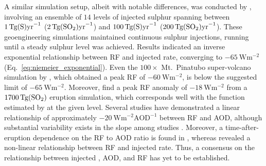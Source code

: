 \documentclass[draft]{agujournal2019}
\begin{document}
  A similar simulation setup, albeit with notable differences, was conducted by
  , involving an ensemble of \(14\) levels of injected sulphur
  spanning between \(\SI{1}{\tera\gram(\ce{S})\mathrm{yr}^{-1}}\)
  (\(\SI{2}{\tera\gram(\ce{SO2})\mathrm{yr}^{-1}}\)) and
  \(\SI{100}{\tera\gram(\ce{S})\mathrm{yr}^{-1}}\)
  (\(\SI{200}{\tera\gram(\ce{SO2})\mathrm{yr}^{-1}}\)). These geoengineering simulations
  maintained continuous sulphur injections, running until a steady sulphur level was
  achieved. Results indicated an inverse exponential relationship between RF and
  injected  rate, converging to \(\SI{-65}{\watt\metre^{-2}}\)
  (Eq.~\ref{eq:niemeier_exponential}). Even the \(100\times\) Mt.\ Pinatubo
  super-volcano simulation by , which obtained a peak RF of
  \(\SI{-60}{\watt\metre^{-2}}\), is below the suggested limit of
  \(\SI{-65}{\watt\metre^{-2}}\). Moreover,  find a peak RF anomaly
  of \(\SI{-18}{\watt\metre^{-2}}\) from a \(\SI{1700}{\tera\gram(\ce{SO2})}\) eruption
  simulation, which corresponds well with the function estimated by 
  at the given  level. Several studies have demonstrated a linear relationship
  of approximately \(-\SI{20}{\watt\metre^{-2}\mathrm{AOD}^{-1}}\) between RF and AOD,
  although substantial variability exists in the slope among studies
  \cite{mills2017,hansen2005,gregory2016,marshall2020,pitari2016b}. Moreover, a
  time-after-eruption dependence on the RF to AOD ratio is found in
  , whereas  revealed a non-linear relationship
  between RF and injected  rate. Thus, a consensus on the relationship between
  injected , AOD, and RF has yet to be established.
\end{document}
